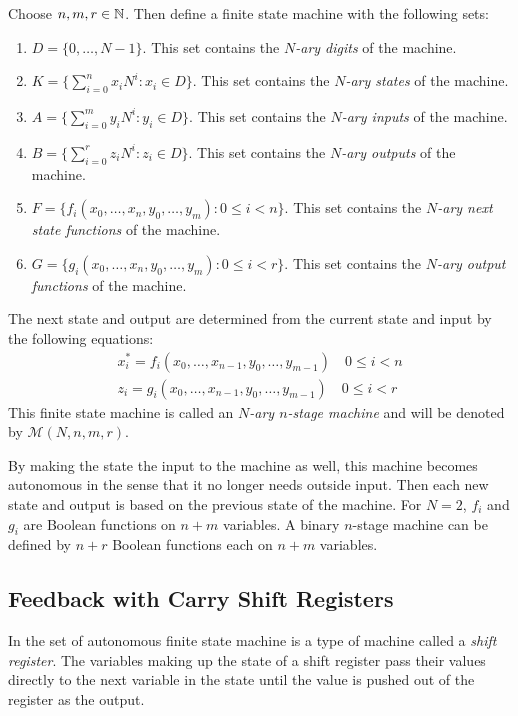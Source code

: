 \begin{definition}\label{N-ary-n-stage-machine}
  Choose $n,m,r\in\mathbb{N}$. Then define a finite state machine with the
  following sets:
  \begin{enumerate}[1.]
    \item $D=\{0,\dots,N-1\}$. This set contains the {\em $N$-ary digits} of the
      machine.
    \item $K=\{\sum_{i=0}^{n}x_iN^i:x_i\in D\}$. This set contains the
      {\em $N$-ary states} of the machine.
    \item $A=\{\sum_{i=0}^{m}y_iN^i:y_i\in D\}$. This set contains the
      {\em $N$-ary inputs} of the machine.
    \item $B=\{\sum_{i=0}^{r}z_iN^i:z_i\in D\}$. This set contains the
      {\em $N$-ary outputs} of the machine.
    \item $F=\{f_i(x_0,\dots,x_n,y_0,\dots,y_m):0\le i<n\}$. This set contains
      the {\em $N$-ary next state functions} of the machine.
    \item $G=\{g_i(x_0,\dots,x_n,y_0,\dots,y_m):0\le i<r\}$. This set contains
      the {\em $N$-ary output functions} of the machine.
  \end{enumerate}
  The next state and output are determined from the current state and input by the
  following equations:
  \begin{eqnarray}
    x_i^*=f_i(x_0,\dots,x_{n-1},y_0,\dots,y_{m-1}) \quad 0\le i<n \\
    z_i=g_i(x_0,\dots,x_{n-1},y_0,\dots,y_{m-1}) \quad 0\le i<r
  \end{eqnarray}
  This finite state machine is called an {\em $N$-ary $n$-stage machine} and
  will be denoted by $\mathcal{M}(N,n,m,r)$.
\end{definition}

\par By making the state the input to the machine as well, this machine
becomes autonomous in the sense that it no longer needs outside input. Then
each new state and output is based on the previous state of the machine. For
$N=2$, $f_i$ and $g_i$ are Boolean functions on $n+m$ variables.
A binary $n$-stage machine can be defined by $n+r$ Boolean functions each
on $n+m$ variables.

\subsection{Feedback with Carry Shift Registers}

\par In the set of autonomous finite state machine is a type of machine
called a {\it shift register}. The variables making up the state of a shift
register pass their values directly to the next variable in the state until
the value is pushed out of the register as the output.


